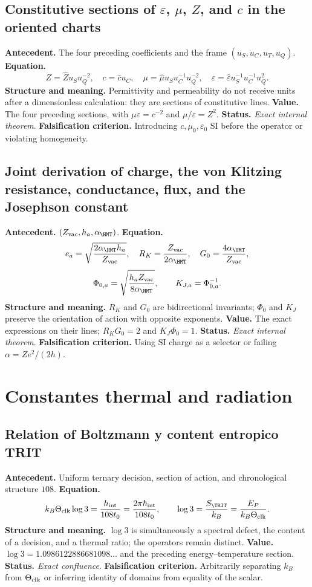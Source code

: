 \subsection*{Constitutive sections of \(\varepsilon\), \(\mu\), \(Z\), and \(c\) in the oriented charts}
\textbf{Antecedent.} The four preceding
coefficients and the frame \((u_S,u_C,u_T,u_Q)\).
\textbf{Equation.}
\[
Z=\widehat Zu_Su_Q^{-2},\quad c=\widehat cu_C,\quad
\mu=\widehat\mu u_Su_C^{-1}u_Q^{-2},\quad
\varepsilon=\widehat\varepsilon u_S^{-1}u_C^{-1}u_Q^2.
\]
\textbf{Structure and meaning.} Permittivity and permeability do not
receive units after a dimensionless calculation: they are sections of
constitutive lines. \textbf{Value.} The four preceding sections, with
\(\mu\varepsilon=c^{-2}\) and \(\mu/\varepsilon=Z^2\).
\textbf{Status.} \emph{Exact internal theorem}. \textbf{Falsification criterion.} Introducing
\(c,\mu_0,\varepsilon_0\) SI before the operator or violating homogeneity.

\subsection*{Joint derivation of charge, the von Klitzing resistance, conductance, flux, and the Josephson constant}
\textbf{Antecedent.} \((Z_{\rm vac},h_a,\alpha_{\HMT})\).
\textbf{Equation.}
\[
e_a=\sqrt{\frac{2\alpha_{\HMT}h_a}{Z_{\rm vac}}},\quad
R_K=\frac{Z_{\rm vac}}{2\alpha_{\HMT}},\quad
G_0=\frac{4\alpha_{\HMT}}{Z_{\rm vac}},
\]
\[
\Phi_{0,a}=\sqrt{\frac{h_aZ_{\rm vac}}{8\alpha_{\HMT}}},
\qquad K_{J,a}=\Phi_{0,a}^{-1}.
\]
\textbf{Structure and meaning.} \(R_K\) and \(G_0\) are bidirectional
invariants; \(\Phi_0\) and \(K_J\) preserve the orientation of action with
opposite exponents. \textbf{Value.} The exact expressions on their lines;
\(R_KG_0=2\) and \(K_J\Phi_0=1\). \textbf{Status.}
\emph{Exact internal theorem}. \textbf{Falsification criterion.} Using SI charge as a selector or
failing \(\alpha=Ze^2/(2h)\).

\section{Constantes thermal and radiation}

\subsection*{Relation of Boltzmann y content entropico TRIT }
\textbf{Antecedent.} Uniform ternary decision, section of action, and
chronological structure \(108\). \textbf{Equation.}
\[
k_B\Theta_{\rm clk}\log3=\frac{h_{\rm int}}{108t_0}
=\frac{2\pi\hbar_{\rm int}}{108t_0},
\qquad
\log3=\frac{S_{\TRIT}}{k_B}=\frac{E_P}{k_B\Theta_{\rm clk}}.
\]
\textbf{Structure and meaning.} \(\log3\) is simultaneously a spectral
defect, the content of a decision, and a thermal ratio; the operators
remain
distinct. \textbf{Value.} \(\log3=1.0986122886681098\ldots\) and the preceding
energy--temperature section. \textbf{Status.} \emph{Exact
confluence}. \textbf{Falsification criterion.} Arbitrarily separating \(k_B\) from
\(\Theta_{\rm clk}\) or inferring identity of domains from equality of the scalar.

